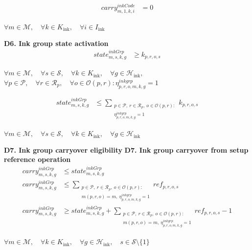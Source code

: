 \documentclass{article}
\begin{document}
\begin{align}
carry^{inkCode}_{m,1,k,i}
&=
0
\label{eq:D5_ink_code_carry_initial}
\end{align}
\begin{center}
$\forall m \in \mathcal{M}, \quad
\forall k \in K_{\text{ink}}, \quad
\forall i \in I_{\text{ink}}$
\end{center}

\noindent\textbf{D6. Ink group state activation}
\begin{align}
state^{inkGrp}_{m,s,k,g}
&\ge
k_{p,r,o,s}
\label{eq:D6_ink_group_state_lb}
\end{align}
\begin{center}
$\forall m \in \mathcal{M}, \quad
\forall s \in \mathcal{S}, \quad
\forall k \in K_{\text{ink}}, \quad
\forall g \in \mathcal{H}_{\text{ink}},$
\\
$\forall p \in \mathcal{P}, \quad
\forall r \in \mathcal{R}_p, \quad
\forall o \in \mathcal{O}(p,r):
\eta^{inkgrp}_{p,r,o,m,k,g}=1$
\end{center}

\begin{align}
state^{inkGrp}_{m,s,k,g}
&\le
\sum_{\substack{
p \in \mathcal{P},\ r \in \mathcal{R}_p,\ o \in \mathcal{O}(p,r):\\
\eta^{inkgrp}_{p,r,o,m,k,g}=1
}}
k_{p,r,o,s}
\label{eq:D6_ink_group_state_ub}
\end{align}
\begin{center}
$\forall m \in \mathcal{M}, \quad
\forall s \in \mathcal{S}, \quad
\forall k \in K_{\text{ink}}, \quad
\forall g \in \mathcal{H}_{\text{ink}}$
\end{center}

\noindent\textbf{D7. Ink group carryover eligibility}
\noindent\textbf{D7. Ink group carryover from setup reference operation}
\begin{align}
carry^{inkGrp}_{m,s,k,g}
&\le
state^{inkGrp}_{m,s,k,g}
\label{eq:D7_ink_group_carry_current_state}
\\
carry^{inkGrp}_{m,s,k,g}
&\le
\sum_{\substack{
p \in \mathcal{P},\ r \in \mathcal{R}_p,\ o \in \mathcal{O}(p,r):\\
m(p,r,o)=m,\ \eta^{inkgrp}_{p,r,o,m,k,g}=1
}}
ref_{p,r,o,s}
\label{eq:D7_ink_group_carry_reference_ub}
\\
carry^{inkGrp}_{m,s,k,g}
&\ge
state^{inkGrp}_{m,s,k,g}
+
\sum_{\substack{
p \in \mathcal{P},\ r \in \mathcal{R}_p,\ o \in \mathcal{O}(p,r):\\
m(p,r,o)=m,\ \eta^{inkgrp}_{p,r,o,m,k,g}=1
}}
ref_{p,r,o,s}
- 1
\label{eq:D7_ink_group_carry_reference_lb}
\end{align}
\begin{center}
$\forall m \in \mathcal{M}, \quad
\forall k \in K_{\text{ink}}, \quad
\forall g \in \mathcal{H}_{\text{ink}}, \quad
s \in \mathcal{S}\setminus\{1\}$
\end{center}
\end{document}
